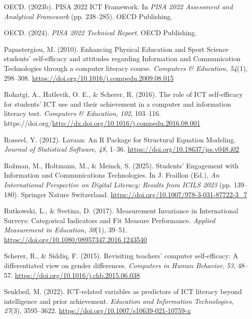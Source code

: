 \documentclass[
  letterpaper,
  DIV=11,
  numbers=noendperiod]{scrartcl}
\newlength{\cslhangindent}
\newenvironment{CSLReferences}[2] %
 {\begin{list}{}{%
  \setlength{\itemindent}{0pt}
  \setlength{\leftmargin}{0pt}
  \setlength{\parsep}{0pt}
  \ifodd #1
   \setlength{\leftmargin}{\cslhangindent}
   \setlength{\itemindent}{-1\cslhangindent}
  \fi
  \setlength{\itemsep}{#2\baselineskip}}}
 {\end{list}}
\begin{document}
\begin{CSLReferences}{1}{0}
OECD. (2023b). {PISA} 2022 {ICT Framework}. In \emph{{PISA} 2022
{Assessment} and {Analytical Framework}} (pp. 238--285). OECD
Publishing.

OECD. (2024). \emph{{PISA} 2022 {Technical Report}}. OECD Publishing.

Papastergiou, M. (2010). Enhancing {Physical Education} and {Sport
Science} students' self-efficacy and attitudes regarding {Information}
and {Communication Technologies} through a computer literacy course.
\emph{Computers \& Education}, \emph{54}(1), 298--308.
\url{https://doi.org/10.1016/j.compedu.2009.08.015}

Rohatgi, A., Hatlevik, O. E., \& Scherer, R. (2016). The role of {ICT}
self-efficacy for students' {ICT} use and their achievement in a
computer and information literacy test. \emph{Computers \& Education},
\emph{102}, 103--116.
https://doi.org/\url{http://dx.doi.org/10.1016/j.compedu.2016.08.001}

Rosseel, Y. (2012). Lavaan: {An R Package} for {Structural Equation
Modeling}. \emph{Journal of Statistical Software}, \emph{48}, 1--36.
\url{https://doi.org/10.18637/jss.v048.i02}

Rožman, M., Holtmann, M., \& Meinck, S. (2025). Students' {Engagement}
with {Information} and {Communications Technologies}. In J. Fraillon
(Ed.), \emph{An {International Perspective} on {Digital Literacy}:
{Results} from {ICILS} 2023} (pp. 139--180). Springer Nature
Switzerland. \url{https://doi.org/10.1007/978-3-031-87722-3_7}

Rutkowski, L., \& Svetina, D. (2017). Measurement {Invariance} in
{International Surveys}: {Categorical Indicators} and {Fit Measure
Performance}. \emph{Applied Measurement in Education}, \emph{30}(1),
39--51. \url{https://doi.org/10.1080/08957347.2016.1243540}

Scherer, R., \& Siddiq, F. (2015). Revisiting teachers' computer
self-efficacy: {A} differentiated view on gender differences.
\emph{Computers in Human Behavior}, \emph{53}, 48--57.
\url{https://doi.org/10.1016/j.chb.2015.06.038}

Senkbeil, M. (2022). {ICT-related} variables as predictors of {ICT}
literacy beyond intelligence and prior achievement. \emph{Education and
Information Technologies}, \emph{27}(3), 3595--3622.
\url{https://doi.org/10.1007/s10639-021-10759-x}


\end{CSLReferences}
\end{document}
